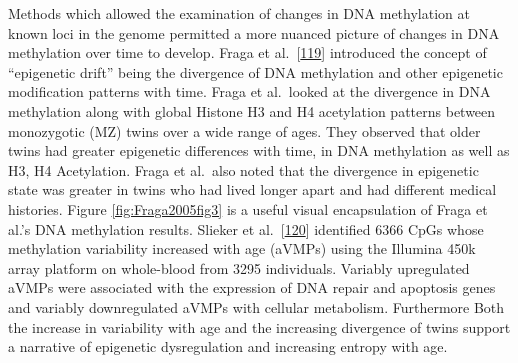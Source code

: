 \documentclass[
]{book}
\begin{document}
Methods which allowed the examination of changes in DNA methylation at known loci in the genome permitted a more nuanced picture of changes in DNA methylation over time to develop.
Fraga et al.~{[}\protect\hyperlink{ref-Fraga2005}{119}{]} introduced the concept of ``epigenetic drift'' being the divergence of DNA methylation and other epigenetic modification patterns with time.
Fraga et al.~looked at the divergence in DNA methylation along with global Histone H3 and H4 acetylation patterns between monozygotic (MZ) twins over a wide range of ages.
They observed that older twins had greater epigenetic differences with time, in DNA methylation as well as H3, H4 Acetylation.
Fraga et al.~also noted that the divergence in epigenetic state was greater in twins who had lived longer apart and had different medical histories.
Figure \ref{fig:Fraga2005fig3} is a useful visual encapsulation of Fraga et al.'s DNA methylation results.
Slieker et al.~{[}\protect\hyperlink{ref-Slieker2016}{120}{]} identified 6366 CpGs whose methylation variability increased with age (aVMPs) using the Illumina 450k array platform on whole-blood from 3295 individuals.
Variably upregulated aVMPs were associated with the expression of DNA repair and apoptosis genes and variably downregulated aVMPs with cellular metabolism.
Furthermore
Both the increase in variability with age and the increasing divergence of twins support a narrative of epigenetic dysregulation and increasing entropy with age.
\end{document}
